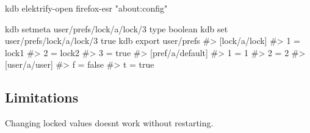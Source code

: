 \begin{DoxyCode}
kdb elektrify-open firefox-esr "about:config"
\end{DoxyCode}





\begin{DoxyCode}
kdb setmeta user/prefs/lock/a/lock/3 type boolean
kdb set user/prefs/lock/a/lock/3 true
kdb export user/prefs
#> [lock/a/lock]
#> 1 = lock1
#> 2 = lock2
#> 3 = true
#> [pref/a/default]
#> 1 = 1
#> 2 = 2
#> [user/a/user]
#> f = false
#> t = true
\end{DoxyCode}




\subsection*{Limitations}

Changing locked values doesn\textquotesingle{}t work without restarting. 
